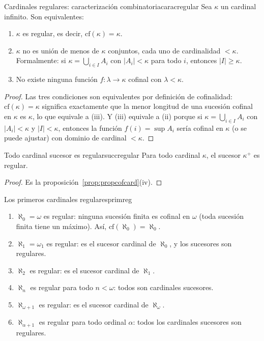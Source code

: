 \begin{teorema}{Cardinales regulares: caracterización combinatoria}{caracregular}
Sea $\kappa$ un cardinal infinito. Son equivalentes:
\begin{enumerate}[leftmargin=2em, label=(\roman*)]
  \item $\kappa$ es regular, es decir, $\mathrm{cf}(\kappa) = \kappa$.
  \item $\kappa$ no es unión de menos de $\kappa$ conjuntos, cada uno de cardinalidad $< \kappa$. Formalmente: si $\kappa = \bigcup_{i \in I} A_i$ con $|A_i| < \kappa$ para todo $i$, entonces $|I| \geq \kappa$.
  \item No existe ninguna función $f \colon \lambda \to \kappa$ cofinal con $\lambda < \kappa$.
\end{enumerate}
\end{teorema}

\begin{proof}
Las tres condiciones son equivalentes por definición de cofinalidad: $\mathrm{cf}(\kappa) = \kappa$ significa exactamente que la menor longitud de una sucesión cofinal en $\kappa$ es $\kappa$, lo que equivale a (iii). Y (iii) equivale a (ii) porque si $\kappa = \bigcup_{i \in I} A_i$ con $|A_i| < \kappa$ y $|I| < \kappa$, entonces la función $f(i) = \sup A_i$ sería cofinal en $\kappa$ (o se puede ajustar) con dominio de cardinal $< \kappa$.
\end{proof}

\begin{corolario}{Todo cardinal sucesor es regular}{succregular}
Para todo cardinal $\kappa$, el sucesor $\kappa^+$ es regular.
\end{corolario}

\begin{proof}
Es la proposición~\ref{prop:propcofcard}(iv).
\end{proof}

\begin{ejemplo}{Los primeros cardinales regulares}{primreg}
\begin{enumerate}[leftmargin=2em, label=(\alph*)]
  \item $\aleph_0 = \omega$ es regular: ninguna sucesión finita es cofinal en $\omega$ (toda sucesión finita tiene un máximo). Así, $\mathrm{cf}(\aleph_0) = \aleph_0$.
  \item $\aleph_1 = \omega_1$ es regular: es el sucesor cardinal de $\aleph_0$, y los sucesores son regulares.
  \item $\aleph_2$ es regular: es el sucesor cardinal de $\aleph_1$.
  \item $\aleph_n$ es regular para todo $n < \omega$: todos son cardinales sucesores.
  \item $\aleph_{\omega+1}$ es regular: es el sucesor cardinal de $\aleph_\omega$.
  \item $\aleph_{\alpha+1}$ es regular para todo ordinal $\alpha$: todos los cardinales sucesores son regulares.
\end{enumerate}
\end{ejemplo}

